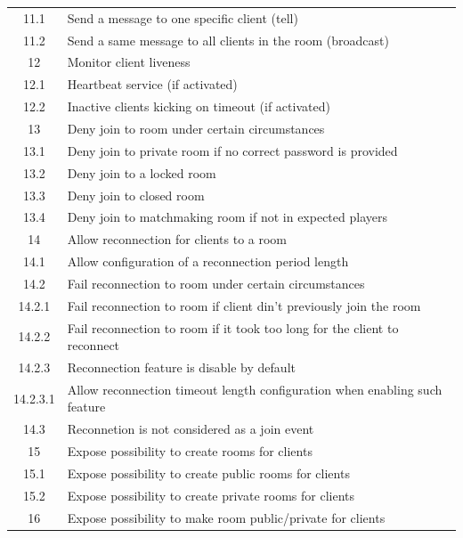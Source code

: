 \begin{center}
\begin{longtable}{|c|l|}
11.1      & Send a message to one specific client (tell) \\
11.2      & Send a same message to all clients in the room (broadcast) \\
12        & Monitor client liveness \\
12.1      & Heartbeat service (if activated) \\
12.2      & Inactive clients kicking on timeout (if activated) \\
13        & Deny join to room under certain circumstances \\
13.1      & Deny join to private room if no correct password is provided \\
13.2      & Deny join to a locked room \\
13.3      & Deny join to closed room \\
13.4      & Deny join to matchmaking room if not in expected players \\
14        & Allow reconnection for clients to a room \\
14.1      & Allow configuration of a reconnection period length \\
14.2      & Fail reconnection to room under certain circumstances \\
14.2.1    & Fail reconnection to room if client din't previously join the room \\
14.2.2    & Fail reconnection to room if it took too long for the client to reconnect \\
14.2.3    & Reconnection feature is disable by default \\
14.2.3.1  & Allow reconnection timeout length configuration when enabling such feature \\
14.3      & Reconnetion is not considered as a join event \\
15        & Expose possibility to create rooms for clients \\
15.1      & Expose possibility to create public rooms for clients \\
15.2      & Expose possibility to create private rooms for clients \\
16        & Expose possibility to make room public/private for clients \\
\hline

\end{longtable}
\end{center}

